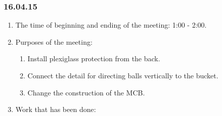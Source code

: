 \subsubsection{16.04.15}
\begin{enumerate}
	
	\item The time of beginning and ending of the meeting: 1:00 - 2:00.
	
	\item Purposes of the meeting: 
	\begin{enumerate}
		
		\item Install plexiglass protection from the back.
		
		\item Connect the detail for directing balls vertically to the bucket.
		
        \item Change the construction of the MCB.
		
	\end{enumerate}

	\item Work that has been done:
	\begin{enumerate}
		

\end{enumerate}
\end{enumerate}
